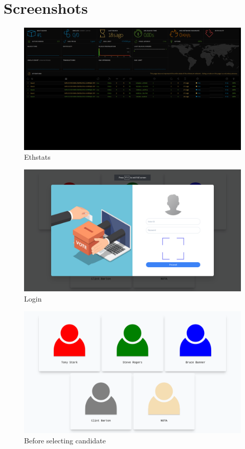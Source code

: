\documentclass[oneside, 12pt]{book}
\begin{document}
\section{Screenshots}
\newpage
\begin{figure}[H]
	\includegraphics[width=\linewidth]{./Resources/ethstats.png}
	\caption{Ethstats}
	\label{fig:ethstats}
\end{figure}
\begin{figure}[H]
	\includegraphics[width=\linewidth]{./Resources/login.png}
	\caption{Login}
	\label{fig:login}
\end{figure}
\begin{figure}[H]
	\includegraphics[width=\linewidth]{./Resources/pre-vote.png}
	\caption{Before selecting candidate}
	\label{fig:pre-vote}
\end{figure}
\end{document}
